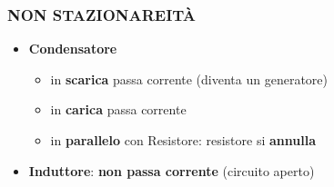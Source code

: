 \documentclass{article}
\begin{document}
\subsubsection{NON STAZIONAREITÀ}
\begin{itemize}
  \item \textbf{Condensatore} 
  \begin{itemize}
    \item in \textbf{scarica} passa corrente (diventa un generatore)
    \item in \textbf{carica} passa corrente
    \item in \textbf{parallelo} con Resistore: resistore si \textbf{annulla}
  \end{itemize}
  \item \textbf{Induttore}: \textbf{non passa corrente} (circuito aperto) 
\end{itemize}
\end{document}
